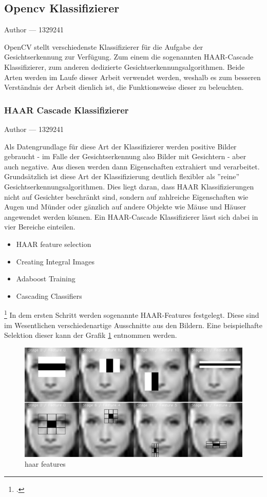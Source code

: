 \documentclass[12pt, a4paper]{report}
\makeatletter
\newcommand*\setcaptioncitation[1]{\def\captioncitation{\textit{Quelle:}~#1}}
\let\captioncitation\relax
\newcommand{\sectionauthor}[1]{%
  {\parindent0pt\vspace*{-5pt}%
  \large{Author --- }
  \linespread{1.1}\large\scshape#1%
  \par\nobreak\vspace*{35pt} }
  \@afterheading%
}
\makeatother
\begin{document}
\subsection{Opencv Klassifizierer}
\sectionauthor{1329241}
OpenCV stellt verschiedenste Klassifizierer für die Aufgabe der Gesichtserkennung zur Verfügung. Zum einem die sogenannten HAAR-Cascade Klassifizierer, zum anderen dedizierte Gesichtserkennungsalgorithmen. Beide Arten werden im Laufe dieser Arbeit verwendet werden, weshalb es zum besseren Verständnis der Arbeit dienlich ist, die Funktionsweise dieser zu beleuchten.

\subsubsection{HAAR Cascade Klassifizierer}
\sectionauthor{1329241}
Als Datengrundlage für diese Art der Klassifizierer werden positive Bilder gebraucht - im Falle der Gesichtserkennung also Bilder mit Gesichtern - aber auch negative. Aus diesen werden dann Eigenschaften extrahiert und verarbeitet. Grundsätzlich ist diese Art der Klassifizierung deutlich flexibler als ''reine'' Gesichtserkennungsalgorithmen. Dies liegt daran, dass HAAR Klassifizierungen nicht auf Gesichter beschränkt sind, sondern auf zahlreiche Eigenschaften wie Augen und Münder oder gänzlich auf andere Objekte wie Mäuse und Häuser angewendet werden können. Ein HAAR-Cascade Klassifizierer lässt sich dabei in vier Bereiche einteilen.
\begin{itemize}
\item HAAR feature selection
\item Creating Integral Images
\item Adaboost Training
\item Cascading Classifiers
\end{itemize}
\footcite[Vgl.][]{willberger}
In dem ersten Schritt werden sogenannte HAAR-Features festgelegt. Diese sind im Wesentlichen verschiedenartige Ausschnitte aus den Bildern. Eine beispielhafte Selektion dieser kann der Grafik \ref{fig: haar-features} entnommen werden.
\begin{figure}[h]
\includegraphics[width=\linewidth]{Bilder/haar-cascade.png}
\setcaptioncitation{ https://docs.opencv.org/master/dc/d88/tutorial\_traincascade.html}
\caption{haar features}
\label{fig: haar-features}
\end{figure}
\end{document}
